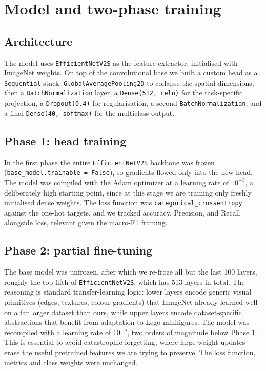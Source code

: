 \section{Model and two-phase training}
\subsection{Architecture}
The model uses \texttt{EfficientNetV2S} as the feature extractor, initialised with ImageNet weights. On top of the convolutional base we built a custom head as a \texttt{Sequential} stack: \texttt{GlobalAveragePooling2D} to collapse the spatial dimensions, then a \texttt{BatchNormalization} layer, a \texttt{Dense(512, relu)} for the task-specific projection, a \texttt{Dropout(0.4)} for regularisation, a second \texttt{BatchNormalization}, and a final \texttt{Dense(40, softmax)} for the multiclass output.

\subsection{Phase 1: head training}
In the first phase the entire \texttt{EfficientNetV2S} backbone was frozen (\texttt{base\_model.trainable = False}), so gradients flowed only into the new head. The model was compiled with the Adam optimizer at a learning rate of $10^{-3}$, a deliberately high starting point, since at this stage we are training only freshly initialised dense weights. The loss function was \texttt{categorical\_crossentropy} against the one-hot targets, and we tracked accuracy, Precision, and Recall alongside loss, relevant given the macro-F1 framing.

\subsection{Phase 2: partial fine-tuning}
The base model was unfrozen, after which we re-froze all but the last 100 layers, roughly the top fifth of \texttt{EfficientNetV2S}, which has 513 layers in total. The reasoning is standard transfer-learning logic: lower layers encode generic visual primitives (edges, textures, colour gradients) that ImageNet already learned well on a far larger dataset than ours, while upper layers encode dataset-specific abstractions that benefit from adaptation to Lego minifigures.
The model was recompiled with a learning rate of $10^{-5}$, two orders of magnitude below Phase 1. This is essential to avoid catastrophic forgetting, where large weight updates erase the useful pretrained features we are trying to preserve. The loss function, metrics and class weights were unchanged. 

